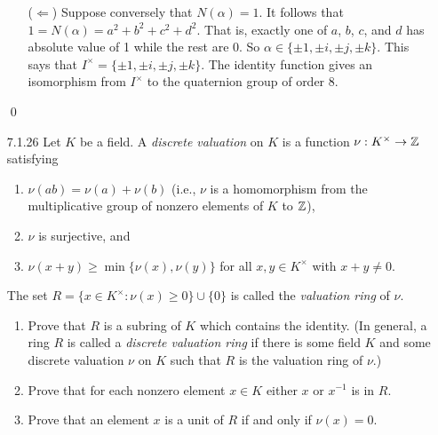 \begin{enumerate}
\begin{enumerate}
               ($\Leftarrow$) Suppose conversely that $N(\alpha) = 1$. It
               follows that
               $1 = N(\alpha) = a^2 + b^2 + c^2 + d^2$. That is, exactly one of
               $a$, $b$, $c$, and $d$ has absolute value of 1 while the rest are
               0. So $\alpha \in \{\pm1, \pm i, \pm j, \pm k\}$. This says that
               $I^\times = \{\pm1, \pm i, \pm j, \pm k\}$. The identity function
               gives an isomorphism from $I^\times$ to the quaternion group of
               order 8.
      \end{enumerate} \qed
   \item[7.1.26]  Let $K$ be a field. A \textit{discrete valuation} on $K$ is a
                  function $\nu : K^\times \rightarrow \mathbb{Z}$ satisfying
                  \begin{enumerate}\renewcommand{\labelenumii}{(\roman{enumii})}
                     \item $\nu(ab) = \nu(a) + \nu(b)$ (i.e., $\nu$ is a
                           homomorphism from the multiplicative group of nonzero
                           elements of $K$ to $\mathbb{Z}$),
                     \item $\nu$ is surjective, and
                     \item $\nu(x + y) \ge \min\{\nu(x), \nu(y)\}$ for all
                           $x, y \in K^\times$ with $x + y \neq 0$.
                  \end{enumerate}
                  The set $R = \{x \in K^\times : \nu(x) \ge 0\} \cup \{0\}$ is
                  called the \textit{valuation ring} of $\nu$.
                  \begin{enumerate}
                     \item Prove that $R$ is a subring of $K$ which contains the
                           identity. (In general, a ring $R$ is called a
                           \textit{discrete valuation ring} if there is some
                           field $K$ and some discrete valuation $\nu$ on $K$
                           such that $R$ is the valuation ring of $\nu$.)
                     \item Prove that for each nonzero element $x \in K$ either
                           $x$ or $x^{-1}$ is in $R$.
                     \item Prove that an element $x$ is a unit of $R$ if and only
                           if $\nu(x) = 0$.
                  \end{enumerate}


\end{enumerate}
